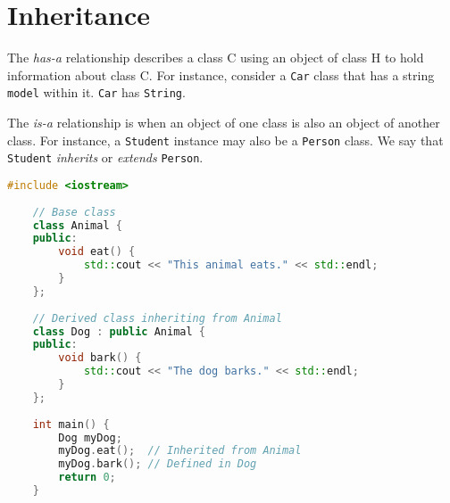 \section{Inheritance}

The \emph{has-a} relationship describes a class C
using an object of class H to hold information
about class C. For instance, consider a \texttt{Car}
class that has a string \texttt{model} within it.
\texttt{Car} has \texttt{String}.

The \emph{is-a} relationship is when an object
of one class is also an object of another class.
For instance, a \texttt{Student} instance may also be a
\texttt{Person} class. We say that \texttt{Student}
\emph{inherits} or \emph{extends} \texttt{Person}.

\begin{lstlisting}[language=C++, caption={Inheritance}]
    #include <iostream>
    
    // Base class
    class Animal {
    public:
        void eat() {
            std::cout << "This animal eats." << std::endl;
        }
    };
    
    // Derived class inheriting from Animal
    class Dog : public Animal {
    public:
        void bark() {
            std::cout << "The dog barks." << std::endl;
        }
    };
    
    int main() {
        Dog myDog;
        myDog.eat();  // Inherited from Animal
        myDog.bark(); // Defined in Dog
        return 0;
    }
    \end{lstlisting}